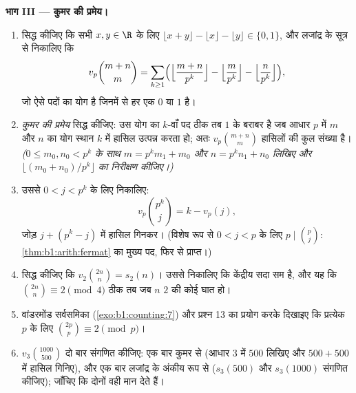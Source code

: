 \begin{problem}
\medskip \noindent\textbf{भाग III --- कुमर की प्रमेय।}
\begin{enumerate}[resume]
  \item सिद्ध कीजिए कि सभी $x, y \in \R$ के लिए $\lfloor x + y \rfloor -
  \lfloor x \rfloor - \lfloor y \rfloor \in \{0, 1\}$, और लजांद्र के सूत्र
  से निकालिए कि
        \[
        v_p\binom{m+n}m
        = \sum_{k\geq1}\Bigl(
        \Bigl\lfloor\frac{m+n}{p^k}\Bigr\rfloor
        - \Bigl\lfloor\frac{m}{p^k}\Bigr\rfloor
        - \Bigl\lfloor\frac{n}{p^k}\Bigr\rfloor\Bigr),
        \]
        जो ऐसे पदों का योग है जिनमें से हर एक $0$ या $1$ है।
  \item \emph{कुमर की प्रमेय} सिद्ध कीजिए: उस योग का $k$-वाँ पद ठीक तब $1$
  के बराबर है जब आधार $p$ में $m$ और $n$ का योग स्थान $k$ में हासिल उत्पन्न
  करता हो; अतः $v_p\binom{m+n}m$ हासिलों की कुल संख्या है। \emph{($0 \leq
  m_0, n_0 < p^k$ के साथ $m = p^km_1 + m_0$ और $n = p^kn_1 + n_0$ लिखिए और
  $\lfloor (m_0 + n_0)/p^k \rfloor$ का निरीक्षण कीजिए।)}
  \item उससे $0 < j < p^k$ के लिए निकालिए:
        \[
        v_p\binom{p^k}{j} = k - v_p(j) ,
        \]
        जोड़ $j + (p^k - j)$ में हासिल गिनकर। (विशेष रूप से $0 < j < p$ के
        लिए $p \mid \binom p j$: \cref{thm:b1:arith:fermat} का मुख्य पद, फिर
        से प्राप्त।)
  \item सिद्ध कीजिए कि $v_2\binom{2n}n = s_2(n)$। उससे निकालिए कि केंद्रीय
   सदा सम है, और यह कि $\binom{2n}n \equiv 2 \pmod 4$ ठीक तब जब
  $n$ $2$ की कोई घात हो।
  \item वांडरमोंड सर्वसमिका (\cref{exo:b1:counting:7}) और प्रश्न 13 का
  प्रयोग करके दिखाइए कि प्रत्येक  $p$ के लिए $\binom{2p}p \equiv 2
  \pmod p$।
  \item $v_3\binom{1000}{500}$ दो बार संगणित कीजिए: एक बार कुमर से (आधार $3$
  में $500$ लिखिए और $500 + 500$ में हासिल गिनिए), और एक बार लजांद्र के
  अंकीय रूप से ($s_3(500)$ और $s_3(1000)$ संगणित कीजिए); जाँचिए कि दोनों वही
  मान देते हैं।
\end{enumerate}


\end{problem}
